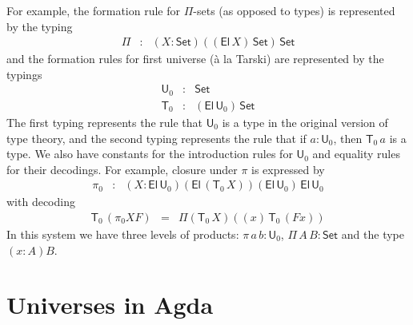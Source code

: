 \documentclass[10pt,a4paper]{article}
\def\UU{\mathsf{U}}
\newcommand{\Set}{\mathsf{Set}}
\newcommand{\El}{\mathsf{El}}
\newcommand{\T}{\mathsf{T}}
\begin{document}
For example, the formation rule for $\Pi$-sets (as opposed to types) is represented by the typing
\begin{eqnarray*}
\Pi &:& (X:\Set)((\El\,X)\,\Set)\,\Set
\end{eqnarray*}
and the formation rules for first universe (\`a la Tarski) are represented by the typings
\begin{eqnarray*}
\UU_0 &: &\Set\\
\T_0 &:& (\El\,\UU_0)\,\Set
\end{eqnarray*}
The first typing represents the rule that $\UU_0$ is a type in the original version of type theory, and the second typing represents the rule that if $a : \UU_0$, then $\T_0\,a$ is a type. We also have constants for the introduction rules for $\UU_0$ and equality rules for their decodings. For example, closure under $\pi$ is expressed by
\begin{eqnarray*}
\pi_0 &:& (X:\El\, \UU_0)(\El\, (\T_0\, X))(\El\, \UU_0)\,\El\, \UU_0
\end{eqnarray*}
with decoding
\begin{eqnarray*}
\T_0\, (\pi_0 X F) &=& \Pi (\T_0\, X) ((x)\,\T_0\, (F x))
\end{eqnarray*}
In this system we have three levels of products: $\pi\,a\,b : \UU_0$, $\Pi\,A\,B : \Set$ and the type $(x : A)B$.
%
%
%

\section{Universes in Agda}
\end{document}
